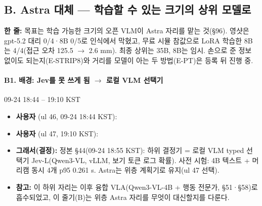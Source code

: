 \subsection{B. Astra 대체 --- 학습할 수 있는 크기의 상위 모델로}\label{rec:B}
\noindent\textbf{한 줄:} 목표는 학습 가능한 크기의 오픈 VLM이 Astra 자리를 맡는 것(§96). 영샷은 gpt-5.2 대리 0/4·8B 0/5로 인식에서 막혔고, 무료 시뮬 참값으로 LoRA 학습한 8B는 4/4(접근 오차 125.5 $\rightarrow$ 2.6 mm). 최종 상위는 35B, 8B는 임시. 손으로 준 정보 없이도 되는지(E-STRIP8)와 거리를 모델이 아는 두 방법(E-PT)은 등록 뒤 진행 중.

\paragraph{B1. 배경: Jev를 못 쓰게 됨 $\rightarrow$ 로컬 VLM 선택기}
{\small 09-24 18:44 -- 19:10 KST}
\begin{itemize}
  \item \textbf{사용자} (ul 46, 09-24 18:44 KST): 
  \item \textbf{사용자} (ul 47, 19:10 KST): 
  \item \textbf{그래서(결정):} 정본 §44(09-24 18:55 KST): 하위 결정기 = 로컬 VLM typed 선택기 Jev-L(Qwen3-VL, vLLM, 보기 토큰 로그 확률). 사전 시험: 4B 텍스트 + 머리캠 동시 4개 p95 0.261 s. Astra는 위층 계획기로 유지(ul 47 선택).
  \item \textbf{참고:} 이 하위 자리는 이후 융합 VLA(Qwen3-VL-4B + 행동 전문가, §51·§58)로 흡수되었고, 이 줄기(B)는 위층 Astra 자리를 무엇이 대신할지를 다룬다.
\end{itemize}

